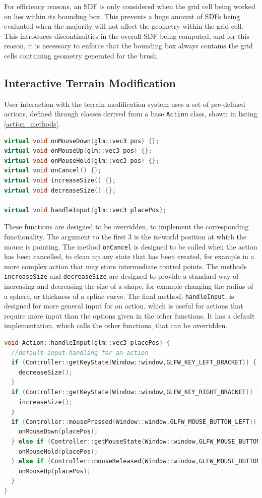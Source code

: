 \documentclass[11pt]{article}
\begin{document}
For efficiency reasons, an SDF is only considered when the grid cell being worked on lies within its bounding box. This prevents a huge amount of SDFs being evaluated when the majority will not affect the geometry within the grid cell. This introduces discontinuities in the overall SDF being computed, and for this reason, it is necessary to enforce that the bounding box always contains the grid cells containing geometry generated for the brush.

\subsection{Interactive Terrain Modification}
User interaction with the terrain modification system uses a set of pre-defined actions, defined through classes derived from a base \texttt{Action} class, shown in listing \ref{action_methods}.

\begin{lstlisting}[language=C++,label={action_methods},caption={The methods of the \texttt{Action} class responsible for handling user interaction}]
virtual void onMouseDown(glm::vec3 pos) {};
virtual void onMouseUp(glm::vec3 pos) {};
virtual void onMouseHold(glm::vec3 pos) {};
virtual void onCancel() {};
virtual void increaseSize() {};
virtual void decreaseSize() {};

virtual void handleInput(glm::vec3 placePos);
\end{lstlisting}
These functions are designed to be overridden, to implement the corresponding functionality. The argument to the first 3 is the in-world position at which the mouse is pointing. The method \texttt{onCancel} is designed to be called when the action has been cancelled, to clean up any state that has been created, for example in a more complex action that may store intermediate control points. The methods \texttt{increaseSize} and \texttt{decreaseSize} are designed to provide a standard way of increasing and decreasing the size of a shape, for example changing the radius of a sphere, or thickness of a spline curve. The final method, \texttt{handleInput}, is designed for more general input for an action, which is useful for actions that require more input than the options given in the other functions. It has a default implementation, which calls the other functions, that can be overridden.
\begin{lstlisting}[language=C++,label={action_handleinput},caption={Default implementation of \texttt{handleInput}.}]
void Action::handleInput(glm::vec3 placePos) {
  //default input handling for an action
  if (Controller::getKeyState(Window::window,GLFW_KEY_LEFT_BRACKET)) {
    decreaseSize();
  }
  if (Controller::getKeyState(Window::window,GLFW_KEY_RIGHT_BRACKET)) {
    increaseSize();
  }
  if (Controller::mousePressed(Window::window,GLFW_MOUSE_BUTTON_LEFT)) {
    onMouseDown(placePos);
  } else if (Controller::getMouseState(Window::window,GLFW_MOUSE_BUTTON_LEFT)) {
    onMouseHold(placePos);
  } else if (Controller::mouseReleased(Window::window,GLFW_MOUSE_BUTTON_LEFT)) {
    onMouseUp(placePos);
  }
}
\end{lstlisting}
\end{document}

